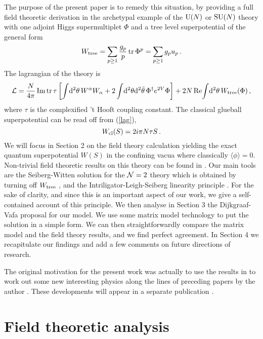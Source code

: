 \documentclass[a4paper,12pt]{article}
\def\tr{\mathop{\rm tr}\nolimits}
\def\im{\mathop{\rm Im}\nolimits}
\def\re{\mathop{\rm Re}\nolimits}
\def\d{{\rm d}}
\def\suN{{\rm SU}(N)}
\def\uN{{\rm U}(N)}
\def\wt{W_{\rm tree}}\def\weff{W_{\rm eff}}\def\ww{{\cal W}}
\begin{document}
The purpose of the present paper is to remedy this situation, by 
providing a full field theoretic derivation in the archetypal 
example of the $\uN$ or $\suN$ theory with one adjoint Higgs 
supermultiplet $\Phi$ and a tree level superpotential of the general form
%
\begin{equation}
\label{Wtreedef}
\wt  = \sum_{p\geq 1}{g_{p}\over p} \tr\Phi^{p}= \sum_{p\geq 1}
g_{p} u_{p}\, .
\end{equation}
%
The lagrangian of the theory is
%
\begin{equation}
\label{lag}
{\cal L} = {N\over 4\pi}\im\tr\tau\left[\int\!\d^{2}\theta\,
W^{\alpha}W_{\alpha} + 2\int\!\d^{2}\theta\d^{2}\bar\theta\, 
\Phi^{\dagger} e^{2V}\Phi\right] + 
2N\re\!\int\!\d^{2}\theta\, \wt(\Phi)\, ,
\end{equation}
%
where $\tau$ is the complexified 't Hooft coupling constant. 
The classical glueball superpotential can be read off from (\ref{lag}), 
%
\begin{equation}
\label{wcl}
W_{\rm cl}(S) = 2 i\pi N \tau S\, .
\end{equation}
%
We will focus in Section 2 on the field theory calculation yielding
the exact quantum superpotential $W(S)$ in the confining vacua where
classically $\langle\phi\rangle =0$. Non-trivial field theoretic 
results on this theory can be found in \cite{CIV,CV}.
Our main tools are the
Seiberg-Witten solution for the ${\cal N}=2$ theory which is obtained
by turning off $\wt$ \cite{SW1,SW2}, and the Intriligator-Leigh-Seiberg
linearity principle \cite{ILS}. For the sake of clarity, and since
this is an important aspect of our work, we give a self-contained
account of this principle. We then analyse in Section 3 the
Dijkgraaf-Vafa proposal for our model. We use some matrix model
technology to put the solution in a simple form. We can then
straightforwardly compare the matrix model and the field theory
results, and we find perfect agreement. In Section 4 we recapitulate
our findings and add a few comments on future directions of research.

The original motivation for the present work was actually to use the
results in \cite{DV} to work out some new interesting physics along
the lines of preceding papers by the author \cite{F}.
These developments will appear in a separate publication \cite{fer}.

%
\section{Field theoretic analysis}
%
\end{document}
